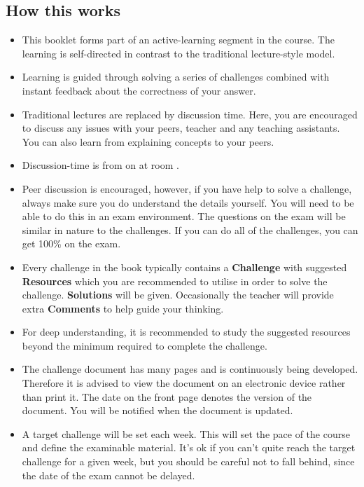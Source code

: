 \subsection{How this works}
\begin{itemize}
    \item This booklet forms part of an active-learning segment in the course. The learning is self-directed in contrast to the traditional lecture-style model.
    \item Learning is guided through solving a series of challenges combined with instant feedback about the correctness of your answer.
    \item Traditional lectures are replaced by discussion time. Here, you are encouraged to discuss any issues with your peers, teacher and any teaching assistants. You can also learn from explaining concepts to your peers.
    \item Discussion-time is from \disctime on \discdays at room \discroom.
    \item Peer discussion is encouraged, however, if you have help to solve a challenge, always make sure you do understand the details yourself. You will need to be able to do this in an exam environment. The questions on the exam will be similar in nature to the challenges. If you can do all of the challenges, you can get 100\% on the exam.
    \item Every challenge in the book typically contains a \textbf{Challenge} with suggested \textbf{Resources} which you are recommended to utilise in order to solve the challenge. \textbf{Solutions} will be given. Occasionally the teacher will provide extra \textbf{Comments} to help guide your thinking.
    \item For deep understanding, it is recommended to study the suggested resources beyond the minimum required to complete the challenge.
    \item The challenge document has many pages and is continuously being developed. Therefore it is advised to view the document on an electronic device rather than print it. The date on the front page denotes the version of the document. You will be notified when the document is updated.
    \item A target challenge will be set each week. This will set the pace of the course and define the examinable material. It's ok if you can't quite reach the target challenge for a given week, but you should be careful not to fall behind, since the date of the exam cannot be delayed.
\end{itemize}

